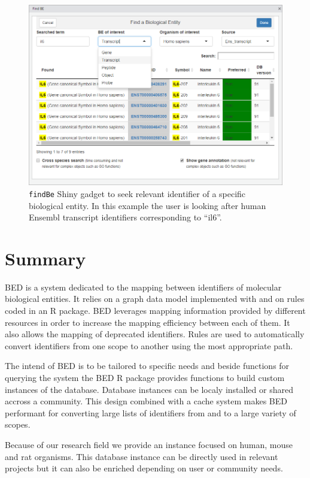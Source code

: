 \documentclass[9pt,a4paper,]{extarticle}
\theoremstyle{definition}
\theoremstyle{definition}
\theoremstyle{definition}
\theoremstyle{remark}
\begin{document}
\begin{figure}

{\centering \includegraphics[width=0.8\linewidth]{img/findBe} 

}

\caption{\texttt{findBe} Shiny gadget to seek relevant identifier of a specific biological entity. In this example the user is looking after human Ensembl transcript identifiers corresponding to ``il6''.}\label{fig:findBe}
\end{figure}

\section{Summary}\label{summary}

BED is a system dedicated to the mapping between identifiers of molecular
biological entities. It relies on a graph data model implemented with
\neo{} and on rules coded in an R package.
BED leverages mapping information provided by different resources in order
to increase the mapping efficiency between each of them.
It also allows the mapping of deprecated identifiers.
Rules are used to automatically convert identifiers from one scope to another
using the most appropriate path.

The intend of BED is to be tailored to specific needs and
beside functions for querying the system the BED R package provides functions
to build custom instances of the database.
Database instances can be localy installed or shared accross a community.
This design combined with a cache system makes BED performant for converting
large lists of identifiers from and to a large variety of scopes.

Because of our research field we provide an instance focused on human,
mouse and rat organisms. This database instance can be directly used
in relevant projects but it can also be enriched depending on user or
community needs.
\end{document}

